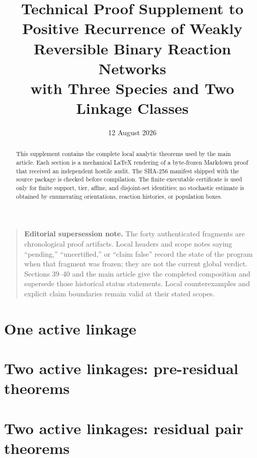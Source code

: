 \documentclass[10pt]{article}
\title{Technical Proof Supplement to\\
Positive Recurrence of Weakly Reversible Binary Reaction Networks\\
with Three Species and Two Linkage Classes}
\author{}
\date{12 August 2026}
\theoremstyle{definition}
\theoremstyle{remark}
\begin{document}
\maketitle

\begin{abstract}
This supplement contains the complete local analytic theorems used by the
main article.  Each section is a mechanical LaTeX rendering of a byte-frozen
Markdown proof that received an independent hostile audit.  The SHA-256
manifest shipped with the source package is checked before compilation.  The
finite executable certificate is used only for finite support, tier, affine,
and disjoint-set identities; no stochastic estimate is obtained by enumerating
orientations, reaction histories, or population boxes.
\end{abstract}

\begin{quote}
\textbf{Editorial supersession note.}
The forty authenticated fragments are chronological proof artifacts.  Local
headers and scope notes saying ``pending,'' ``uncertified,'' or ``claim
false'' record the state of the program when that fragment was frozen; they
are not the current global verdict.  Sections 39--40 and the main article
give the completed composition and supersede those historical status
statements.  Local counterexamples and explicit claim boundaries remain
valid at their stated scopes.
\end{quote}

\tableofcontents
\clearpage

\part{One active linkage}







\part{Two active linkages: pre-residual theorems}





\part{Two active linkages: residual pair theorems}













\end{document}
